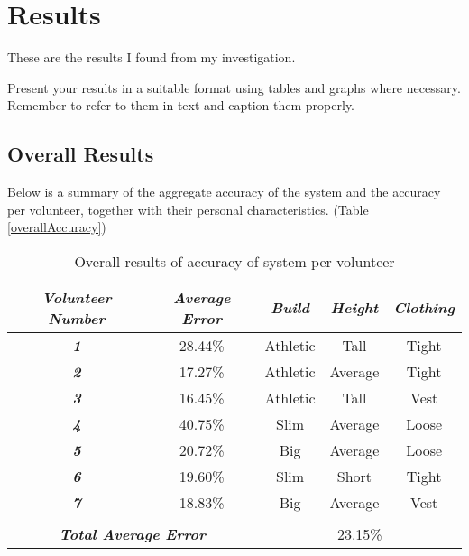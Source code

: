 \chapter{Results}
These are the results I found from my investigation.

Present your results in a suitable format using tables and graphs where necessary. Remember to refer
to them in text and caption them properly.


\section{Overall Results}
 Below is a summary of the aggregate accuracy of the system and the accuracy per volunteer, together with their personal characteristics. (Table \ref{overallAccuracy})
 
 \begin{table}[htbp]
 	\centering
 	\caption{Overall results of accuracy of system per volunteer}
 	\begin{tabular}{|cc|ccc|}
 		\toprule
 		\multicolumn{1}{|c|}{\textit{\textbf{Volunteer Number}}} & \textit{\textbf{Average Error}} & \multicolumn{1}{c|}{\textit{\textbf{Build}}} & \multicolumn{1}{c|}{\textit{\textbf{Height}}} & \textit{\textbf{Clothing}} \\
 		\midrule
 		\multicolumn{1}{|c|}{\textit{\textbf{1}}} & 28.44\% & \multicolumn{1}{c|}{Athletic} & \multicolumn{1}{c|}{Tall} & Tight \\
 		\midrule
 		\multicolumn{1}{|c|}{\textit{\textbf{2}}} & 17.27\% & \multicolumn{1}{c|}{Athletic} & \multicolumn{1}{c|}{Average} & Tight \\
 		\midrule
 		\multicolumn{1}{|c|}{\textit{\textbf{3}}} & 16.45\% & \multicolumn{1}{c|}{Athletic} & \multicolumn{1}{c|}{Tall} & Vest \\
 		\midrule
 		\multicolumn{1}{|c|}{\textit{\textbf{4}}} & 40.75\% & \multicolumn{1}{c|}{Slim} & \multicolumn{1}{c|}{Average} & Loose \\
 		\midrule
 		\multicolumn{1}{|c|}{\textit{\textbf{5}}} & 20.72\% & \multicolumn{1}{c|}{Big} & \multicolumn{1}{c|}{Average} & Loose \\
 		\midrule
 		\multicolumn{1}{|c|}{\textit{\textbf{6}}} & 19.60\% & \multicolumn{1}{c|}{Slim} & \multicolumn{1}{c|}{Short} & Tight \\
 		\midrule
 		\multicolumn{1}{|c|}{\textit{\textbf{7}}} & 18.83\% & \multicolumn{1}{c|}{Big} & \multicolumn{1}{c|}{Average} & Vest \\
 		\midrule
 		\multicolumn{5}{|c|}{} \\
 		\midrule
 		\multicolumn{2}{|c|}{\textit{\textbf{Total Average Error}}} & \multicolumn{3}{c|}{23.15\%} \\
 		\bottomrule
 	\end{tabular}%
 	\label{tab:overallAccuracy}%
 \end{table}%
 

